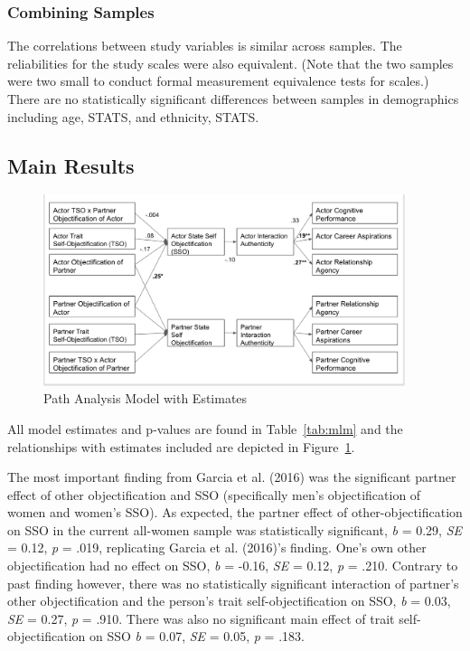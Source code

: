 \documentclass[man]{apa6}
\begin{document}
\subsubsection{Combining Samples}\label{combining-samples}

The correlations between study variables is similar across samples. The
reliabilities for the study scales were also equivalent. (Note that the
two samples were two small to conduct formal measurement equivalence
tests for scales.) There are no statistically significant differences
between samples in demographics including age, STATS, and ethnicity,
STATS.

\subsection{Main Results}\label{main-results}

\begin{figure}
\includegraphics[width=400px]{SEMfigure} \caption{Path Analysis Model with Estimates}\label{fig:semfigure}
\end{figure}

All model estimates and p-values are found in Table~\ref{tab:mlm} and
the relationships with estimates included are depicted in
Figure~\ref{fig:semfigure}.

The most important finding from Garcia et al. (2016) was the significant
partner effect of other objectification and SSO (specifically men's
objectification of women and women's SSO). As expected, the partner
effect of other-objectification on SSO in the current all-women sample
was statistically significant, \emph{b} = 0.29, \emph{SE} = 0.12,
\emph{p} = .019, replicating Garcia et al. (2016)'s finding. One's own
other objectification had no effect on SSO, \emph{b} = -0.16, \emph{SE}
= 0.12, \emph{p} = .210. Contrary to past finding however, there was no
statistically significant interaction of partner's other objectification
and the person's trait self-objectification on SSO, \emph{b} = 0.03,
\emph{SE} = 0.27, \emph{p} = .910. There was also no significant main
effect of trait self-objectification on SSO \emph{b} = 0.07, \emph{SE} =
0.05, \emph{p} = .183.
\end{document}
